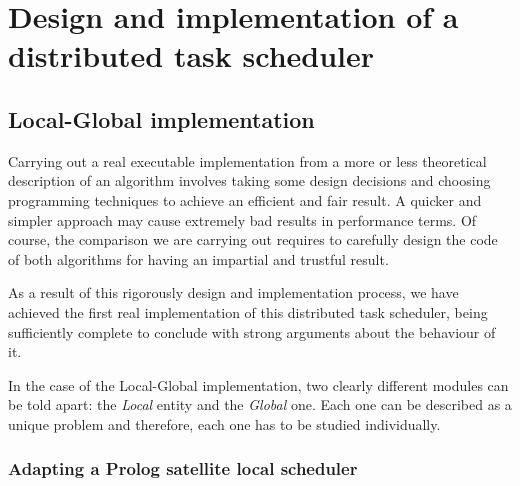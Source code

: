 
\chapter{Design and implementation of a distributed task scheduler} %

\label{Chapter3} %


\section{Local-Global implementation}
\label{LGimplementation}

Carrying out a real executable implementation from a more or less theoretical description of an algorithm involves taking some design decisions and choosing programming techniques to achieve an efficient and fair result. A quicker and simpler approach may cause extremely bad results in performance terms. Of course, the comparison we are carrying out requires to carefully design the code of both algorithms for having an impartial and trustful result.

As a result of this rigorously design and implementation process, we have achieved the first real implementation of this distributed task scheduler, being sufficiently complete to conclude with strong arguments about the behaviour of it.

In the case of the Local-Global implementation, two clearly different modules can be told apart: the \emph{Local} entity and the \emph{Global} one. Each one can be described as a unique problem and therefore, each one has to be studied individually.

\subsection{Adapting a Prolog satellite local scheduler}


